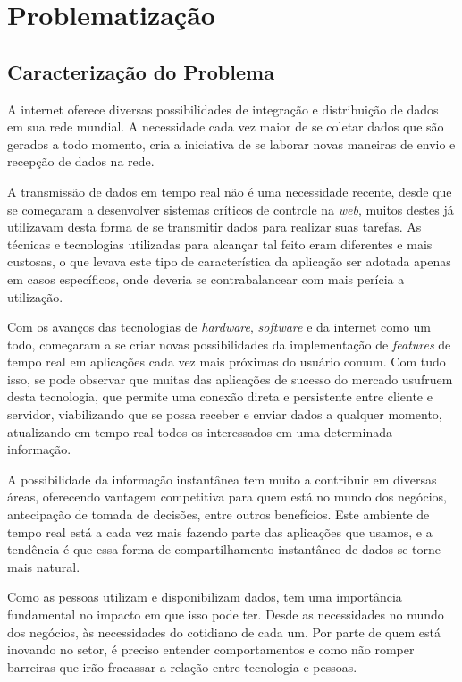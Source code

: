 \chapter{Problematização}
\section{Caracterização do Problema}
A internet oferece diversas possibilidades de integração e distribuição de dados em sua rede mundial. A necessidade cada vez maior de se coletar dados que são gerados a todo momento, cria a iniciativa de se laborar novas maneiras de envio e recepção de dados na rede.

A transmissão de dados em tempo real não é uma necessidade recente, desde que se começaram a desenvolver sistemas críticos de controle na \textit{web}, muitos destes já utilizavam desta forma de se transmitir dados para realizar suas tarefas. As técnicas e tecnologias utilizadas para alcançar tal feito eram diferentes e mais custosas, o que levava este tipo de característica da aplicação ser adotada apenas em casos específicos, onde deveria se contrabalancear com mais perícia a utilização.

Com os avanços das tecnologias de \textit{hardware}, \textit{software} e da internet como um todo, começaram a se criar novas possibilidades da implementação de \textit{features} de tempo real em aplicações cada vez mais próximas do usuário comum. Com tudo isso, se pode observar que muitas das aplicações de sucesso do mercado usufruem desta tecnologia, que permite uma conexão direta e persistente entre cliente e servidor, viabilizando que se possa receber e enviar dados a qualquer momento, atualizando em tempo real todos os interessados em uma determinada informação.

A possibilidade da informação instantânea tem muito a contribuir em diversas áreas, oferecendo vantagem competitiva para quem está no mundo dos negócios, antecipação de tomada de decisões, entre outros benefícios. Este ambiente de tempo real está a cada vez mais fazendo parte das aplicações que usamos, e a tendência é que essa forma de compartilhamento instantâneo de dados se torne mais natural.

Como as pessoas utilizam e disponibilizam dados, tem uma importância fundamental no impacto em que isso pode ter. Desde as necessidades no mundo dos negócios, às necessidades do cotidiano de cada um. Por parte de quem está inovando no setor, é preciso entender comportamentos e como não romper barreiras que irão fracassar a relação entre tecnologia e pessoas. 

